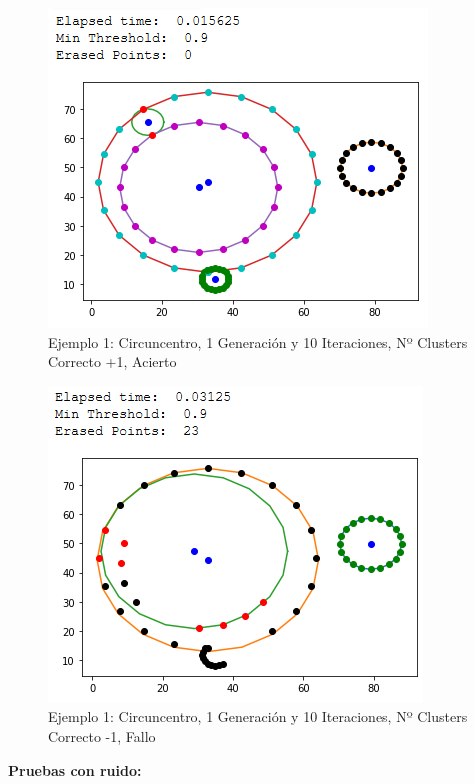 \documentclass[conference,a4paper]{IEEEtran}
\begin{document}
\begin{figure}[H]
\centering
\includegraphics[scale=0.65]{Experimentacion/Ejemplo1/ej1_c_1_10_mc_wrong}
\caption{Ejemplo 1: Circuncentro, 1 Generación y 10 Iteraciones,  Nº Clusters Correcto +1, Acierto\\}
\end{figure}

\begin{figure}[H]
\centering
\includegraphics[scale=0.65]{Experimentacion/Ejemplo1/ej1_c_1_10_lc}
\caption{Ejemplo 1: Circuncentro, 1 Generación y 10 Iteraciones,  Nº Clusters Correcto -1, Fallo\\}
\end{figure}

\textbf{Pruebas con ruido:}\\
\end{document}
